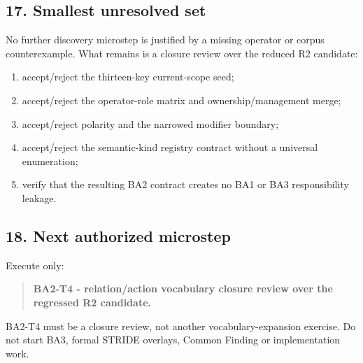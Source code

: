 \documentclass[
  10pt,
  a4paper,
]{article}
\providecommand{\tightlist}{%
  \setlength{\itemsep}{0pt}\setlength{\parskip}{0pt}}
\begin{document}
\subsection{17. Smallest unresolved
set}\label{17-smallest-unresolved-set}

No further discovery microstep is justified by a missing operator or
corpus counterexample. What remains is a closure review over the reduced
R2 candidate:

\begin{enumerate}
\def\labelenumi{\arabic{enumi}.}
\tightlist
\item
  accept/reject the thirteen-key current-scope seed;
\item
  accept/reject the operator-role matrix and ownership/management merge;
\item
  accept/reject polarity and the narrowed modifier boundary;
\item
  accept/reject the semantic-kind registry contract without a universal
  enumeration;
\item
  verify that the resulting BA2 contract creates no BA1 or BA3
  responsibility leakage.
\end{enumerate}

\subsection{18. Next authorized
microstep}\label{18-next-authorized-microstep}

Execute only:

\begin{quote}
\textbf{BA2-T4 - relation/action vocabulary closure review over the
regressed R2 candidate.}
\end{quote}

BA2-T4 must be a closure review, not another vocabulary-expansion
exercise. Do not start BA3, formal STRIDE overlays, Common Finding or
implementation work.
\end{document}
